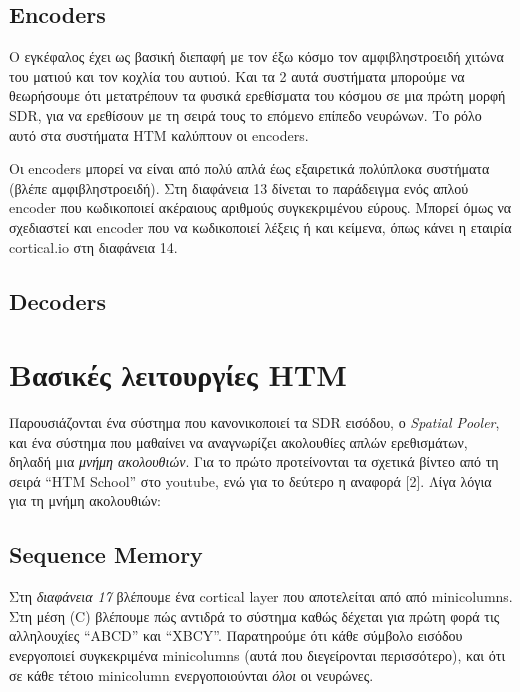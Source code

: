 \subsection{Encoders}

Ο εγκέφαλος έχει ως βασική διεπαφή με τον έξω κόσμο τον αμφιβληστροειδή χιτώνα του ματιού και τον κοχλία του αυτιού.
Και τα 2 αυτά συστήματα μπορούμε να θεωρήσουμε ότι μετατρέπουν τα φυσικά ερεθίσματα του κόσμου σε μια πρώτη μορφή SDR, για να ερεθίσουν με τη σειρά τους το επόμενο επίπεδο νευρώνων.
Το ρόλο αυτό στα συστήματα HTM καλύπτουν οι encoders.

Οι encoders μπορεί να είναι από πολύ απλά έως εξαιρετικά πολύπλοκα συστήματα (βλέπε αμφιβληστροειδή).
Στη διαφάνεια 13 δίνεται το παράδειγμα ενός απλού encoder που κωδικοποιεί ακέραιους αριθμούς συγκεκριμένου εύρους.
Μπορεί όμως να σχεδιαστεί και encoder που να κωδικοποιεί λέξεις ή και κείμενα, όπως κάνει η εταιρία cortical.io \cite{semantic} στη διαφάνεια 14.


\subsection{Decoders}


\section{Βασικές λειτουργίες HTM}

Παρουσιάζονται ένα σύστημα που κανονικοποιεί τα SDR εισόδου, ο \emph{Spatial Pooler}, και ένα σύστημα που μαθαίνει να αναγνωρίζει ακολουθίες απλών ερεθισμάτων, δηλαδή μια \emph{μνήμη ακολουθιών}.
Για το πρώτο προτείνονται τα σχετικά βίντεο από τη σειρά ``HTM School'' στο youtube, ενώ για το δεύτερο η αναφορά [2].
Λίγα λόγια για τη μνήμη ακολουθιών:

\subsection{Sequence Memory}

Στη \emph{διαφάνεια 17} \cite{continuous} βλέπουμε ένα cortical layer που αποτελείται από από minicolumns.
Στη μέση (C) βλέπουμε πώς αντιδρά το σύστημα καθώς δέχεται για πρώτη φορά τις αλληλουχίες ``ABCD'' και ``XBCY''.
Παρατηρούμε ότι κάθε σύμβολο εισόδου ενεργοποιεί συγκεκριμένα minicolumns (αυτά που διεγείρονται περισσότερο), και ότι σε κάθε τέτοιο minicolumn ενεργοποιούνται \emph{όλοι} οι νευρώνες.

